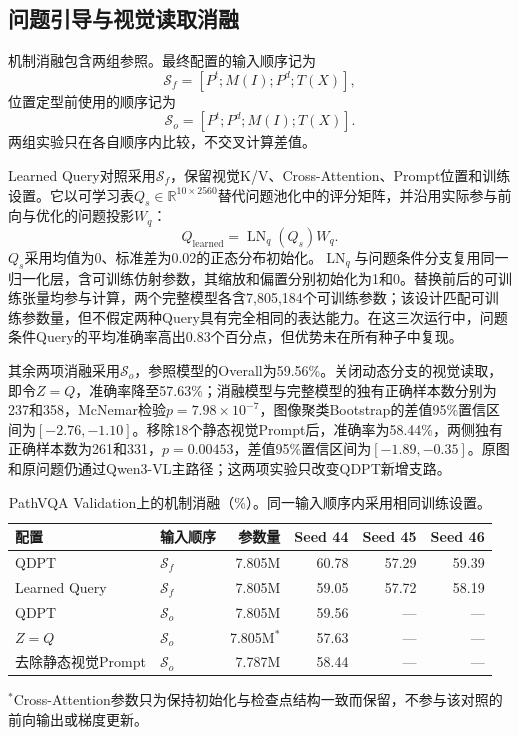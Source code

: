 \subsection{问题引导与视觉读取消融}

机制消融包含两组参照。最终配置的输入顺序记为
\begin{equation}
    \mathcal{S}_{f}=[P^{t};M(I);P^{d};T(X)],
\end{equation}
位置定型前使用的顺序记为
\begin{equation}
    \mathcal{S}_{o}=[P^{t};P^{d};M(I);T(X)].
\end{equation}
两组实验只在各自顺序内比较，不交叉计算差值。

Learned Query对照采用$\mathcal{S}_{f}$，保留视觉K/V、Cross-Attention、Prompt位置和训练设置。它以可学习表$Q_s\in\mathbb{R}^{10\times2560}$替代问题池化中的评分矩阵，并沿用实际参与前向与优化的问题投影$W_q$：
\begin{equation}
    Q_{\mathrm{learned}}=\operatorname{LN}_q(Q_s)W_q.
\end{equation}
$Q_s$采用均值为0、标准差为0.02的正态分布初始化。$\operatorname{LN}_q$与问题条件分支复用同一归一化层，含可训练仿射参数，其缩放和偏置分别初始化为1和0。替换前后的可训练张量均参与计算，两个完整模型各含7,805,184个可训练参数；该设计匹配可训练参数量，但不假定两种Query具有完全相同的表达能力。在这三次运行中，问题条件Query的平均准确率高出0.83个百分点，但优势未在所有种子中复现。

其余两项消融采用$\mathcal{S}_{o}$，参照模型的Overall为59.56\%。关闭动态分支的视觉读取，即令$Z=Q$，准确率降至57.63\%；消融模型与完整模型的独有正确样本数分别为237和358，McNemar检验$p=7.98\times10^{-7}$，图像聚类Bootstrap的差值95\%置信区间为$[-2.76,-1.10]$。移除18个静态视觉Prompt后，准确率为58.44\%，两侧独有正确样本数为261和331，$p=0.00453$，差值95\%置信区间为$[-1.89,-0.35]$。原图和原问题仍通过Qwen3-VL主路径；这两项实验只改变QDPT新增支路。

\begin{table}[t]
    \centering
    \caption{PathVQA Validation上的机制消融（\%）。同一输入顺序内采用相同训练设置。}
    \label{tab:mechanism-ablation}
    \scriptsize
    \setlength{\tabcolsep}{2pt}
    \begin{tabular}{@{}llrrrr@{}}
        \toprule
        配置 & 输入顺序 & 参数量 & Seed 44 & Seed 45 & Seed 46 \\
        \midrule
        QDPT & $\mathcal{S}_{f}$ & 7.805M & 60.78 & 57.29 & 59.39 \\
        Learned Query & $\mathcal{S}_{f}$ & 7.805M & 59.05 & 57.72 & 58.19 \\
        \midrule
        QDPT & $\mathcal{S}_{o}$ & 7.805M & 59.56 & --- & --- \\
        $Z=Q$ & $\mathcal{S}_{o}$ & 7.805M$^{*}$ & 57.63 & --- & --- \\
        去除静态视觉Prompt & $\mathcal{S}_{o}$ & 7.787M & 58.44 & --- & --- \\
        \bottomrule
    \end{tabular}
    \par\smallskip
    \raggedright\footnotesize $^{*}$Cross-Attention参数只为保持初始化与检查点结构一致而保留，不参与该对照的前向输出或梯度更新。
\end{table}

